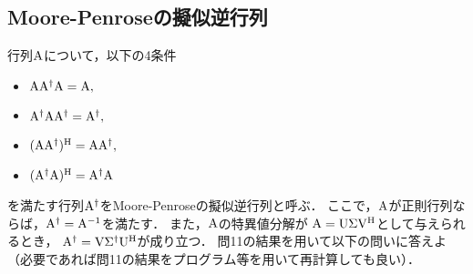 \subsection{Moore-Penroseの擬似逆行列}
  行列$\mathrm{A}$について，以下の4条件
  \begin{itemize}
    \item $\mathrm{A}\mathrm{A}^\dagger\mathrm{A}=\mathrm{A},$
    \item $\mathrm{A}^\dagger\mathrm{A}\mathrm{A}^\dagger=\mathrm{A}^\dagger,$
    \item $(\mathrm{A}\mathrm{A}^\dagger)^\mathrm{H}=\mathrm{A}\mathrm{A}^\dagger,$
    \item $(\mathrm{A}^\dagger\mathrm{A})^\mathrm{H}=\mathrm{A}^\dagger\mathrm{A}$
  \end{itemize}
  を満たす行列$\mathrm{A}^\dagger$をMoore-Penroseの擬似逆行列と呼ぶ．
  ここで，$\mathrm{A}$が正則行列ならば，$\mathrm{A}^\dagger=\mathrm{A}^{-1}$を満たす．
  また，$\mathrm{A}$の特異値分解が
  $\mathrm{A}=\mathrm{U}\mathrm{\Sigma}\mathrm{V}^\mathrm{H}$として与えられるとき，
  $\mathrm{A}^\dagger=\mathrm{V}\mathrm{\Sigma}^\dagger\mathrm{U}^\mathrm{H}$が成り立つ．
  問11の結果を用いて以下の問いに答えよ
  （必要であれば問11の結果をプログラム等を用いて再計算しても良い）．
